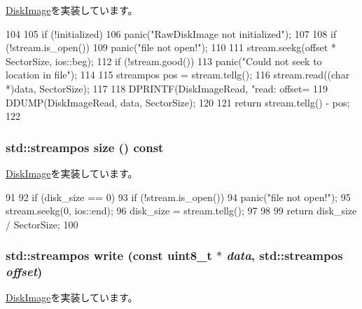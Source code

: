 \hyperlink{classDiskImage_afcf02c1fffcb16ed79ac38bb87fb572c}{DiskImage}を実装しています。


\begin{DoxyCode}
104 {
105     if (!initialized)
106         panic("RawDiskImage not initialized");
107 
108     if (!stream.is_open())
109         panic("file not open!\n");
110 
111     stream.seekg(offset * SectorSize, ios::beg);
112     if (!stream.good())
113         panic("Could not seek to location in file");
114 
115     streampos pos = stream.tellg();
116     stream.read((char *)data, SectorSize);
117 
118     DPRINTF(DiskImageRead, "read: offset=%
119     DDUMP(DiskImageRead, data, SectorSize);
120 
121     return stream.tellg() - pos;
122 }
\end{DoxyCode}
\hypertarget{classRawDiskImage_ac47c8c9bb5ae5fbfa7e05b464d3e20d4}{
\subsubsection[{size}]{\setlength{\rightskip}{0pt plus 5cm}std::streampos size () const}}
\label{classRawDiskImage_ac47c8c9bb5ae5fbfa7e05b464d3e20d4}


\hyperlink{classDiskImage_a0e772d58951a6696fce770bd4c390e9f}{DiskImage}を実装しています。


\begin{DoxyCode}
91 {
92     if (disk_size == 0) {
93         if (!stream.is_open())
94             panic("file not open!\n");
95         stream.seekg(0, ios::end);
96         disk_size = stream.tellg();
97     }
98 
99     return disk_size / SectorSize;
100 }
\end{DoxyCode}
\hypertarget{classRawDiskImage_aadff68e91a6ca912a1878d79af3d0692}{
\subsubsection[{write}]{\setlength{\rightskip}{0pt plus 5cm}std::streampos write (const uint8\_\-t $\ast$ {\em data}, \/  std::streampos {\em offset})}}
\label{classRawDiskImage_aadff68e91a6ca912a1878d79af3d0692}


\hyperlink{classDiskImage_a42c90a80133a988d65ab33cc4d31d168}{DiskImage}を実装しています。


